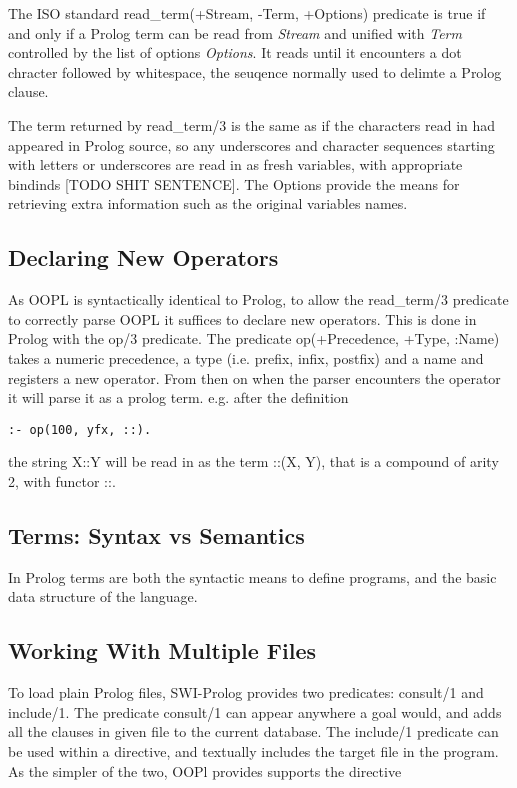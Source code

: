\documentclass[12pt,a4paper,twoside,openright]{report}
\begin{document}
The ISO standard \cite{ISOPROLOG} read_term(+Stream, -Term, +Options) predicate is true if and only if a Prolog term can be read from \emph{Stream} and unified with \emph{Term} controlled by the list of options \emph{Options}. It reads until it encounters a dot chracter followed by whitespace, the seuqence normally used to delimte a Prolog clause.

\bigskip

The term returned by read_term/3 is the same as if the characters read in had appeared in Prolog source, so any underscores and character sequences starting with letters or underscores are read in as fresh variables, with appropriate bindinds [TODO SHIT SENTENCE]. The Options provide the means for retrieving extra information such as the original variables names.

\subsection{Declaring New Operators}

As OOPL is syntactically identical to Prolog, to allow the read_term/3 predicate to correctly parse OOPL it suffices to declare new operators. This is done in Prolog with the op/3 predicate. The predicate op(+Precedence, +Type, :Name) takes a numeric precedence, a type (i.e. prefix, infix, postfix) and a name and registers a new operator. From then on when the parser encounters the operator it will parse it as a prolog term. e.g. after the definition

\begin{verbatim}
:- op(100, yfx, ::).
\end{verbatim}

the string X::Y will be read in as the term ::(X, Y), that is a compound of arity 2, with functor ::. 

\subsection{Terms: Syntax vs Semantics}

In Prolog terms are both the syntactic means to define programs, and the basic data structure of the language. 

\subsection{Working With Multiple Files}

To load plain Prolog files, SWI-Prolog provides two predicates: consult/1 and include/1. The predicate consult/1 can appear anywhere a goal would, and adds all the clauses in given file to the current database. The include/1 predicate can be used within a directive, and textually includes the target file in the program. As the simpler of the two, OOPl provides supports the directive
\end{document}
